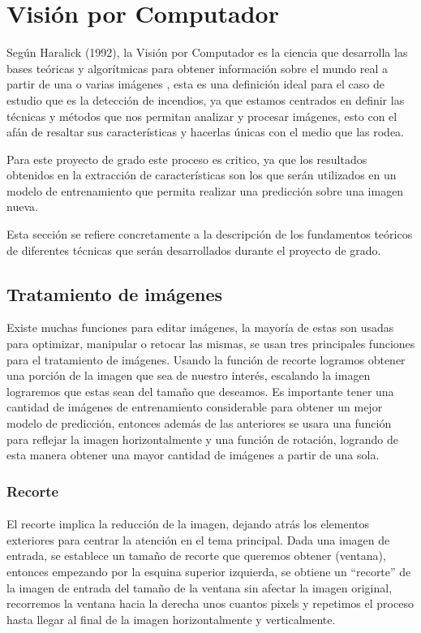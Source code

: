 \section{Visión por Computador}

Según Haralick (1992), la Visión por Computador es la ciencia que desarrolla las bases teóricas y algorítmicas para obtener información sobre el mundo real a partir de una o varias imágenes \cite{haralick1992robot}, esta es una definición ideal para el caso de estudio que es la detección de incendios, ya que estamos centrados en definir las técnicas y métodos que nos permitan analizar y procesar imágenes, esto con el afán de resaltar sus características y hacerlas únicas con el medio que las rodea.

Para este proyecto de grado este proceso es critico, ya que los resultados obtenidos en la extracción de características son los que serán utilizados en un modelo de entrenamiento que permita realizar una predicción sobre una imagen nueva. 

Esta sección se refiere concretamente a la descripción de los fundamentos teóricos de diferentes técnicas que serán desarrollados durante el proyecto de grado.

\subsection{Tratamiento de imágenes}

Existe muchas funciones para editar imágenes, la mayoría de estas son usadas para optimizar, manipular o retocar las mismas, se usan tres principales funciones para el tratamiento de imágenes. Usando la función de recorte logramos obtener una porción de la imagen que sea de nuestro interés, escalando la imagen lograremos que estas sean del tamaño que deseamos. Es importante tener una cantidad de imágenes de entrenamiento considerable para obtener un mejor modelo de predicción, entonces además de las anteriores se usara una función para reflejar la imagen horizontalmente y una función de rotación, logrando de esta manera obtener una mayor cantidad de imágenes a partir de una sola.

\subsubsection{Recorte}

\paragraph{} El recorte implica la reducción de la imagen, dejando atrás los elementos exteriores para centrar la atención en el tema principal. Dada una imagen de entrada, se establece un tamaño de recorte que queremos obtener (ventana), entonces empezando por la esquina superior izquierda, se obtiene un ``recorte'' de la imagen de entrada del tamaño de la ventana sin afectar la imagen original, recorremos la ventana hacia la derecha unos cuantos pixels y repetimos el proceso hasta llegar al final de la imagen horizontalmente y verticalmente.

